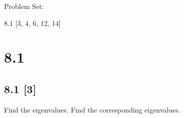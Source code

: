 \documentclass{article}
\begin{document}
{\large \noindent Problem Set:}

\par 8.1 [3, 4, 6, 12, 14]
\vspace{5mm}

\noindent \hrulefill

\section*{8.1}
\setcounter{equation}{0}

\subsection*{8.1 [3]}
\setcounter{equation}{0}

Find the eigenvalues.  Find the corresponding eigenvalues.
\end{document}
